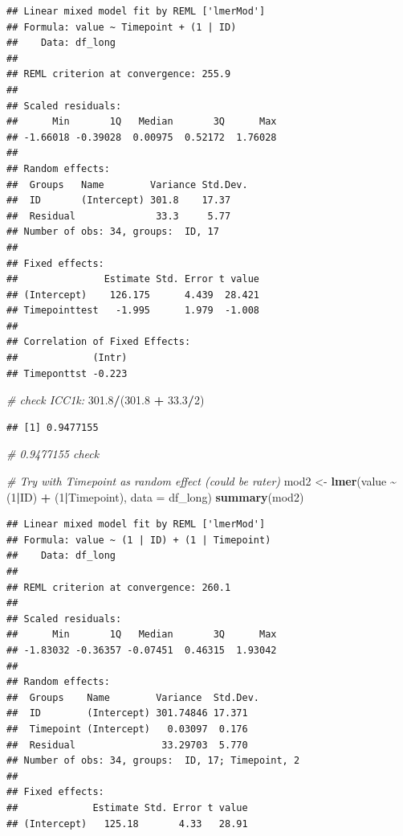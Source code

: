 \documentclass[
]{book}
\newenvironment{Shaded}{\begin{snugshade}}{\end{snugshade}}
\newcommand{\AttributeTok}[1]{\textcolor[rgb]{0.13,0.29,0.53}{#1}}
\newcommand{\CommentTok}[1]{\textcolor[rgb]{0.56,0.35,0.01}{\textit{#1}}}
\newcommand{\DecValTok}[1]{\textcolor[rgb]{0.00,0.00,0.81}{#1}}
\newcommand{\FloatTok}[1]{\textcolor[rgb]{0.00,0.00,0.81}{#1}}
\newcommand{\FunctionTok}[1]{\textcolor[rgb]{0.13,0.29,0.53}{\textbf{#1}}}
\newcommand{\NormalTok}[1]{#1}
\newcommand{\OtherTok}[1]{\textcolor[rgb]{0.56,0.35,0.01}{#1}}
\newcommand{\SpecialCharTok}[1]{\textcolor[rgb]{0.81,0.36,0.00}{\textbf{#1}}}
\begin{document}
\begin{verbatim}
## Linear mixed model fit by REML ['lmerMod']
## Formula: value ~ Timepoint + (1 | ID)
##    Data: df_long
## 
## REML criterion at convergence: 255.9
## 
## Scaled residuals: 
##      Min       1Q   Median       3Q      Max 
## -1.66018 -0.39028  0.00975  0.52172  1.76028 
## 
## Random effects:
##  Groups   Name        Variance Std.Dev.
##  ID       (Intercept) 301.8    17.37   
##  Residual              33.3     5.77   
## Number of obs: 34, groups:  ID, 17
## 
## Fixed effects:
##               Estimate Std. Error t value
## (Intercept)    126.175      4.439  28.421
## Timepointtest   -1.995      1.979  -1.008
## 
## Correlation of Fixed Effects:
##             (Intr)
## Timeponttst -0.223
\end{verbatim}

\begin{Shaded}
\begin{Highlighting}[]
\CommentTok{\# check ICC1k:}
\FloatTok{301.8}\SpecialCharTok{/}\NormalTok{(}\FloatTok{301.8} \SpecialCharTok{+} \FloatTok{33.3}\SpecialCharTok{/}\DecValTok{2}\NormalTok{)}
\end{Highlighting}
\end{Shaded}

\begin{verbatim}
## [1] 0.9477155
\end{verbatim}

\begin{Shaded}
\begin{Highlighting}[]
\CommentTok{\# 0.9477155 check}

\CommentTok{\# Try with Timepoint as random effect (could be rater)}
\NormalTok{mod2 }\OtherTok{\textless{}{-}} \FunctionTok{lmer}\NormalTok{(value }\SpecialCharTok{\textasciitilde{}}\NormalTok{ (}\DecValTok{1}\SpecialCharTok{|}\NormalTok{ID) }\SpecialCharTok{+}\NormalTok{ (}\DecValTok{1}\SpecialCharTok{|}\NormalTok{Timepoint), }\AttributeTok{data =}\NormalTok{ df\_long)}
\FunctionTok{summary}\NormalTok{(mod2)}
\end{Highlighting}
\end{Shaded}

\begin{verbatim}
## Linear mixed model fit by REML ['lmerMod']
## Formula: value ~ (1 | ID) + (1 | Timepoint)
##    Data: df_long
## 
## REML criterion at convergence: 260.1
## 
## Scaled residuals: 
##      Min       1Q   Median       3Q      Max 
## -1.83032 -0.36357 -0.07451  0.46315  1.93042 
## 
## Random effects:
##  Groups    Name        Variance  Std.Dev.
##  ID        (Intercept) 301.74846 17.371  
##  Timepoint (Intercept)   0.03097  0.176  
##  Residual               33.29703  5.770  
## Number of obs: 34, groups:  ID, 17; Timepoint, 2
## 
## Fixed effects:
##             Estimate Std. Error t value
## (Intercept)   125.18       4.33   28.91
\end{verbatim}
\end{document}
